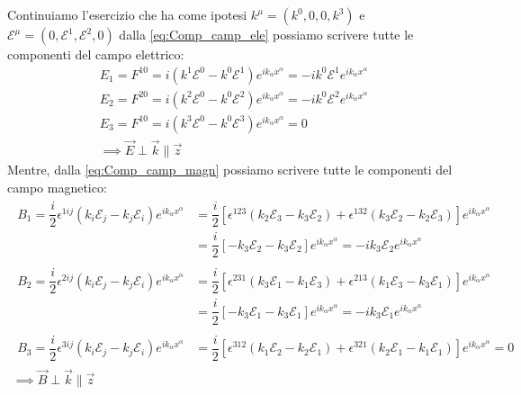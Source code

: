 Continuiamo l'esercizio che ha come ipotesi $k^\mu=(k^0,0,0,k^3)$ e $\mathcal{E}^\mu=(0,\mathcal{E}^1,\mathcal{E}^2,0)$ dalla \eqref{eq:Comp_camp_ele} possiamo scrivere tutte le componenti del campo elettrico:
\begin{equation}
    \begin{gathered}
       E_1=F^{10}=i(k^1\mathcal{E}^0-k^0\mathcal{E}^1)e^{ik_\alpha x^\alpha}=-ik^0\mathcal{E}^1e^{ik_\alpha x^\alpha}\\
        E_2=F^{20}=i(k^2\mathcal{E}^0-k^0\mathcal{E}^2)e^{ik_\alpha x^\alpha}=-ik^0\mathcal{E}^2e^{ik_\alpha x^\alpha}\\
         E_3=F^{10}=i(k^3\mathcal{E}^0-k^0\mathcal{E}^3)e^{ik_\alpha x^\alpha}=0\\
         \implies \Vec{E}\perp\Vec{k}\parallel\Vec{z}
    \end{gathered}
\end{equation}
Mentre, dalla \eqref{eq:Comp_camp_magn} possiamo scrivere tutte le componenti del campo magnetico:
\begin{equation}
    \begin{gathered}
    \begin{aligned}
          B_1=\dfrac{i}{2}\epsilon^{1ij}(k_i\mathcal{E}_j-k_j\mathcal{E}_i)e^{ik_\alpha x^\alpha}&=\dfrac{i}{2}[\epsilon^{123}(k_2\mathcal{E}_3-k_3\mathcal{E}_2)+\epsilon^{132}(k_3\mathcal{E}_2-k_2\mathcal{E}_3)]e^{ik_\alpha x^\alpha}\\
          &=\dfrac{i}{2}[-k_3\mathcal{E}_2-k_3\mathcal{E}_2]e^{ik_\alpha x^\alpha}=-ik_3\mathcal{E}_2e^{ik_\alpha x^\alpha}
    \end{aligned}\\
    \begin{aligned}
          B_2=\dfrac{i}{2}\epsilon^{2ij}(k_i\mathcal{E}_j-k_j\mathcal{E}_i)e^{ik_\alpha x^\alpha}&=\dfrac{i}{2}[\epsilon^{231}(k_3\mathcal{E}_1-k_1\mathcal{E}_3)+\epsilon^{213}(k_1\mathcal{E}_3-k_3\mathcal{E}_1)]e^{ik_\alpha x^\alpha}\\
          &=\dfrac{i}{2}[-k_3\mathcal{E}_1-k_3\mathcal{E}_1]e^{ik_\alpha x^\alpha}=-ik_3\mathcal{E}_1e^{ik_\alpha x^\alpha}
    \end{aligned}\\
    \begin{aligned}
          B_3=\dfrac{i}{2}\epsilon^{3ij}(k_i\mathcal{E}_j-k_j\mathcal{E}_i)e^{ik_\alpha x^\alpha}&=\dfrac{i}{2}[\epsilon^{312}(k_1\mathcal{E}_2-k_2\mathcal{E}_1)+\epsilon^{321}(k_2\mathcal{E}_1-k_1\mathcal{E}_1)]e^{ik_\alpha x^\alpha}=0
    \end{aligned}\\
         \implies \Vec{B}\perp\Vec{k}\parallel\Vec{z}
        \end{gathered}
\end{equation}

